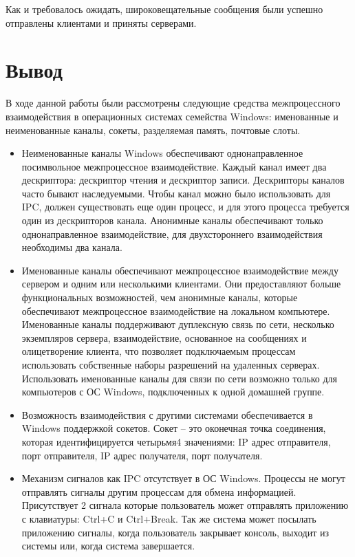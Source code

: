 \documentclass[14pt,a4paper,report]{report}
\begin{document}
Как и требовалось ожидать, широковещательные сообщения были успешно отправлены клиентами и приняты серверами.

\section{Вывод}

В ходе данной работы были рассмотрены следующие средства межпроцессного взаимодействия в операционных системах семейства Windows: именованные и неименованные каналы, сокеты, разделяемая память, почтовые слоты.

\begin{itemize}
	\item Неименованные каналы Windows обеспечивают однонаправленное посимвольное межпроцессное взаимодействие. Каждый канал имеет два дескриптора: дескриптор чтения и дескриптор записи. Дескрипторы каналов часто бывают наследуемыми. Чтобы канал можно было использовать для IPC, должен существовать еще один процесс, и для этого процесса требуется один из дескрипторов канала. Анонимные каналы обеспечивают только однонаправленное взаимодействие, для двухстороннего взаимодействия необходимы два канала.
	
	\item Именованные каналы обеспечивают межпроцессное взаимодействие между сервером и одним или несколькими клиентами. Они предоставляют больше функциональных возможностей, чем анонимные каналы, которые обеспечивают межпроцессное взаимодействие на локальном компьютере. Именованные каналы поддерживают дуплексную связь по сети, несколько экземпляров сервера, взаимодействие, основанное на сообщениях и олицетворение клиента, что позволяет подключаемым процессам использовать собственные наборы разрешений на удаленных серверах. Использовать именованные каналы для связи по сети возможно только для компьютеров с ОС Windows, подключенных к одной домашней группе.
	
	\item Возможность взаимодействия с другими системами обеспечивается в Windows поддержкой сокетов. Сокет – это оконечная точка соединения, которая идентифицируется четырьмя4 значениями: IP адрес отправителя, порт отправителя, IP адрес получателя, порт получателя.
	
	\item Механизм сигналов как IPC отсутствует в ОС Windows. Процессы не могут отправлять сигналы другим процессам для обмена информацией. Присутствует 2 сигнала которые пользователь может отправлять приложению с клавиатуры: Ctrl+C и Ctrl+Break. Так же система может посылать приложению сигналы, когда пользователь закрывает консоль, выходит из системы или, когда система завершается.
	

\end{itemize}
\end{document}
